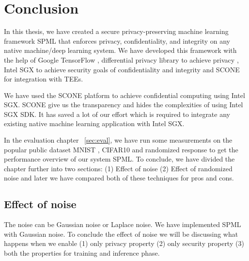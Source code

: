 %
%


\chapter{Conclusion}
\label{sec:conclusion}
In this thesis, we have created a secure privacy-preserving machine learning framework SPML that enforces privacy, confidentiality, and integrity on any native machine/deep learning system. We have developed this framework with the help of Google TensorFlow \cite{24}, differential privacy library to achieve privacy \cite{11}, Intel SGX \cite{9} to achieve security goals of confidentiality and integrity and SCONE \cite{22} for integration with TEEs.

We have used the SCONE platform to achieve confidential computing using Intel SGX. SCONE give us the transparency and hides the complexities of using Intel SGX SDK. It has saved a lot of our effort which is required to integrate any existing native machine learning application with Intel SGX.

In the evaluation chapter ~\ref{sec:eval}, we have run some measurements on the popular public dataset MNIST \cite{12}, CIFAR10 \cite{13} and randomized response to get the performance overview of our system SPML. To conclude, we have divided the chapter further into two sections: (1) Effect of noise (2) Effect of randomized noise and later we have compared both of these techniques for pros and cons.

\section{Effect of noise}
The noise can be Gaussian noise or Laplace noise. We have implemented SPML with Gaussian noise. To conclude the effect of noise we will be discussing what happens when we enable (1) only privacy property (2) only security property (3) both the properties for training and inference phase.
